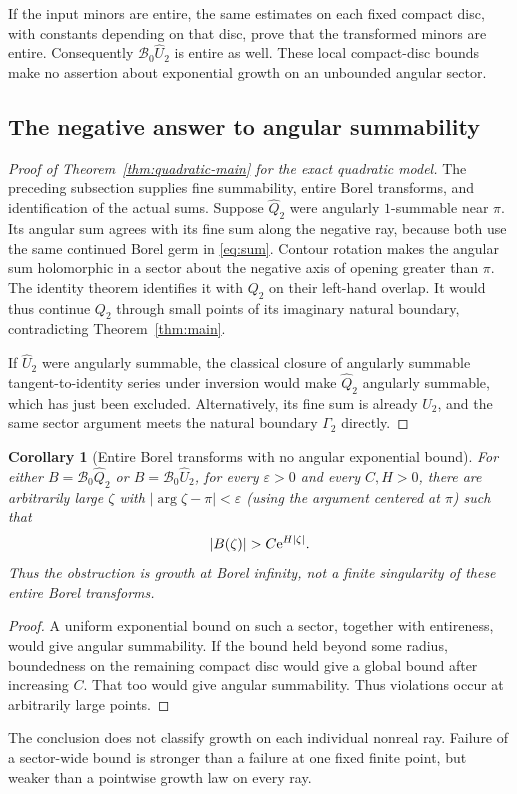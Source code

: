 \documentclass[11pt,a4paper]{article}
\numberwithin{equation}{section}
\newtheorem{corollary}[theorem]{Corollary}
\theoremstyle{definition}\newtheorem{definition}[theorem]{Definition}
\theoremstyle{remark}\newtheorem{remark}[theorem]{Remark}
\theoremstyle{definition}
\newcommand{\Uhat}{\widehat U}\newcommand{\Qhat}{\widehat Q}
\newcommand{\B}{\mathcal B_0}\newcommand{\Hh}{\mathcal H}
\begin{document}
If the input minors are entire, the same estimates on each fixed compact
disc, with constants depending on that disc, prove that the transformed
minors are entire. Consequently $\B\Uhat_2$ is entire as well. These local
compact-disc bounds make no assertion about exponential growth on an
unbounded angular sector.

\subsection{The negative answer to angular summability}
\begin{proof}[Proof of Theorem~\ref{thm:quadratic-main} for the exact quadratic model]
The preceding subsection supplies fine summability, entire Borel transforms,
and identification of the actual sums. Suppose $\Qhat_2$ were angularly
$1$-summable near $\pi$. Its angular sum agrees with its fine sum along the
negative ray, because both use the same continued Borel germ in
\eqref{eq:sum}. Contour rotation makes the angular sum holomorphic in a
sector about the negative axis of opening greater than $\pi$. The identity
theorem identifies it with $Q_2$ on their left-hand overlap. It would thus
continue $Q_2$ through small points of its imaginary natural boundary,
contradicting Theorem~\ref{thm:main}.

If $\Uhat_2$ were angularly summable, the classical closure of angularly
summable tangent-to-identity series under inversion would make $\Qhat_2$
angularly summable, which has just been excluded. Alternatively, its fine
sum is already $U_2$, and the same sector argument meets the natural boundary
$\Gamma_2$ directly.
\end{proof}

\begin{corollary}[Entire Borel transforms with no angular exponential bound]
\label{cor:Borel-growth}
For either $B=\B\Qhat_2$ or $B=\B\Uhat_2$, for every $\varepsilon>0$ and
every $C,H>0$, there are arbitrarily large $\zeta$ with
$|\arg\zeta-\pi|<\varepsilon$ (using the argument centered at $\pi$) such that
\[
 |B(\zeta)|>C\e^{H|\zeta|}.
\]
Thus the obstruction is growth at Borel infinity, not a finite singularity
of these entire Borel transforms.
\end{corollary}
\begin{proof}
A uniform exponential bound on such a sector, together with entireness,
would give angular summability. If the bound held beyond some radius, boundedness on the remaining compact
disc would give a global bound after increasing $C$. That too would give
angular summability. Thus violations occur at arbitrarily large points.
\end{proof}
The conclusion does not classify growth on each individual nonreal ray.
Failure of a sector-wide bound is stronger than a failure at one fixed
finite point, but weaker than a pointwise growth law on every ray.
\end{document}
